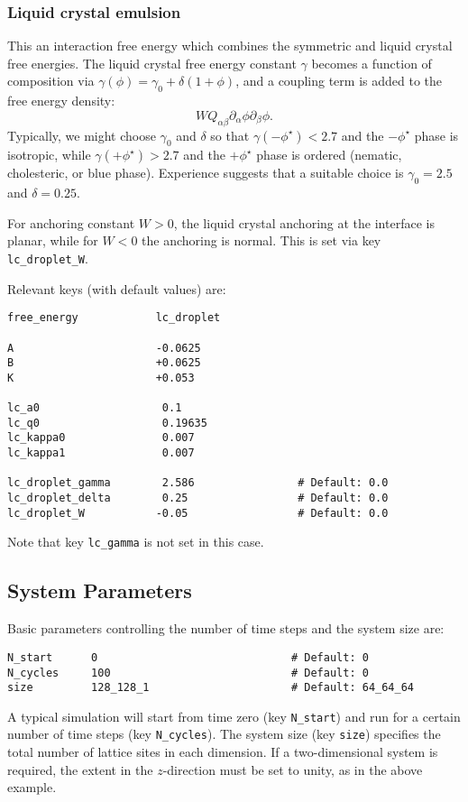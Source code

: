 \subsubsection{Liquid crystal emulsion}
\label{input-liquid-crystal-emulsion}

This an interaction free energy which combines the symmetric and liquid
crystal free energies. The liquid crystal free energy constant $\gamma$
becomes a
function of composition via $\gamma(\phi) = \gamma_0 + \delta(1 + \phi)$,
and a coupling term is added to the free energy density:
\[
WQ_{\alpha\beta} \partial_\alpha \phi \partial_\beta \phi.
\]
Typically, we might choose $\gamma_0$ and $\delta$ so that
$\gamma(-\phi^\star) < 2.7$ and the $-\phi^\star$ phase is isotropic,
while $\gamma(+\phi^\star) > 2.7$ and the
$+\phi^\star$ phase is ordered (nematic, cholesteric, or blue phase).
Experience suggests that a suitable choice is $\gamma_0 = 2.5$ and
$\delta = 0.25$.

For anchoring constant $W > 0$, the liquid crystal anchoring at the
interface is planar, while for $W < 0$ the anchoring is normal. This
is set via key \texttt{lc\_droplet\_W}.

Relevant keys (with default values) are:
\begin{lstlisting}
free_energy            lc_droplet

A                      -0.0625
B                      +0.0625
K                      +0.053

lc_a0                   0.1
lc_q0                   0.19635
lc_kappa0               0.007
lc_kappa1               0.007

lc_droplet_gamma        2.586                # Default: 0.0
lc_droplet_delta        0.25                 # Default: 0.0
lc_droplet_W           -0.05                 # Default: 0.0
\end{lstlisting}
Note that key \texttt{lc\_gamma} is not set in this case.

\subsection{System Parameters}
\label{input-system-parameters}

Basic parameters controlling the number of time steps
and the system size are:
\begin{lstlisting}
N_start      0                              # Default: 0
N_cycles     100                            # Default: 0
size         128_128_1                      # Default: 64_64_64
\end{lstlisting}
A typical simulation will start from time zero (key \texttt{N\_start})
and run for a certain number of time steps (key \texttt{N\_cycles}).
The system size (key \texttt{size}) specifies the total number of
lattice sites in each dimension. If a two-dimensional system is
required, the extent in the $z$-direction must be set to unity, as
in the above example.

